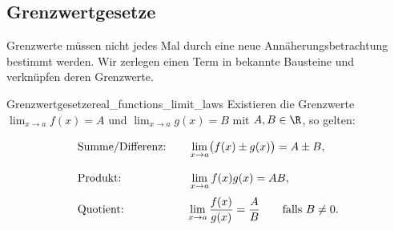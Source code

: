 \subsection{Grenzwertgesetze}
\label{subsec:real_functions_limit_laws}
Grenzwerte müssen nicht jedes Mal durch eine neue Annäherungsbetrachtung
bestimmt werden. Wir zerlegen einen Term in bekannte Bausteine und
verknüpfen deren Grenzwerte.
\begin{TheoremBox}{Grenzwertgesetze}{real_functions_limit_laws}
  Existieren die Grenzwerte $\lim_{x\to a}f(x)=A$ und
  $\lim_{x\to a}g(x)=B$ mit $A,B\in\R$, so gelten:
  \[
    \begin{array}{l@{\qquad}l}
      \text{Summe/Differenz:}&
        \displaystyle\vphantom{\lim_{x\to a}\frac{f(x)}{g(x)}=\frac AB}
        \lim_{x\to a}\bigl(f(x)\pm g(x)\bigr)=A\pm B,\\[1em]
      \text{Produkt:}&
        \displaystyle\vphantom{\lim_{x\to a}\frac{f(x)}{g(x)}=\frac AB}
        \lim_{x\to a}f(x)g(x)=AB,\\[1em]
      \text{Quotient:}&
        \displaystyle\lim_{x\to a}\frac{f(x)}{g(x)}=\frac AB
        \qquad\text{falls }B\ne0.
    \end{array}
  \]
\end{TheoremBox}
